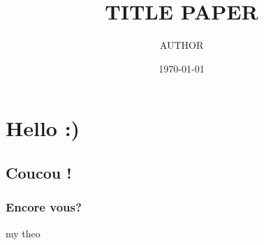 \documentclass{amsart}[11pt]
\title{TITLE PAPER}
\author{AUTHOR}
\date{\today}
\begin{document}
    \begin{abstract}
    \end{abstract}
    \maketitle



    \chapter{Hello :)}


    \section{Coucou !}

    \subsection{Encore vous?}

    \lipsum


    \begin{definition}[my def]
        \lipsum
    \end{definition}


    \begin{theoreme}[label = thrm:X]{my theo}
        \lipsum
    \end{theoreme}

    \begin{demo}{}{}
        \lipsum
    \end{demo}

    \begin{ajoutationV}{}{}
        \lipsum
    \end{ajoutationV}



\printbibliography
\nocite{*}
\end{document}

